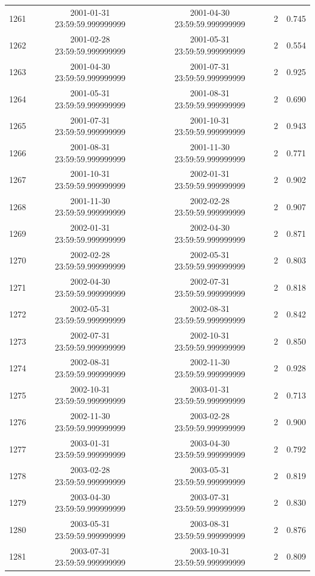 \begin{table}
\begin{tabular}{lcccc}
1261 & 2001-01-31 23:59:59.999999999 & 2001-04-30 23:59:59.999999999 & 2 & 0.745 \\
1262 & 2001-02-28 23:59:59.999999999 & 2001-05-31 23:59:59.999999999 & 2 & 0.554 \\
1263 & 2001-04-30 23:59:59.999999999 & 2001-07-31 23:59:59.999999999 & 2 & 0.925 \\
1264 & 2001-05-31 23:59:59.999999999 & 2001-08-31 23:59:59.999999999 & 2 & 0.690 \\
1265 & 2001-07-31 23:59:59.999999999 & 2001-10-31 23:59:59.999999999 & 2 & 0.943 \\
1266 & 2001-08-31 23:59:59.999999999 & 2001-11-30 23:59:59.999999999 & 2 & 0.771 \\
1267 & 2001-10-31 23:59:59.999999999 & 2002-01-31 23:59:59.999999999 & 2 & 0.902 \\
1268 & 2001-11-30 23:59:59.999999999 & 2002-02-28 23:59:59.999999999 & 2 & 0.907 \\
1269 & 2002-01-31 23:59:59.999999999 & 2002-04-30 23:59:59.999999999 & 2 & 0.871 \\
1270 & 2002-02-28 23:59:59.999999999 & 2002-05-31 23:59:59.999999999 & 2 & 0.803 \\
1271 & 2002-04-30 23:59:59.999999999 & 2002-07-31 23:59:59.999999999 & 2 & 0.818 \\
1272 & 2002-05-31 23:59:59.999999999 & 2002-08-31 23:59:59.999999999 & 2 & 0.842 \\
1273 & 2002-07-31 23:59:59.999999999 & 2002-10-31 23:59:59.999999999 & 2 & 0.850 \\
1274 & 2002-08-31 23:59:59.999999999 & 2002-11-30 23:59:59.999999999 & 2 & 0.928 \\
1275 & 2002-10-31 23:59:59.999999999 & 2003-01-31 23:59:59.999999999 & 2 & 0.713 \\
1276 & 2002-11-30 23:59:59.999999999 & 2003-02-28 23:59:59.999999999 & 2 & 0.900 \\
1277 & 2003-01-31 23:59:59.999999999 & 2003-04-30 23:59:59.999999999 & 2 & 0.792 \\
1278 & 2003-02-28 23:59:59.999999999 & 2003-05-31 23:59:59.999999999 & 2 & 0.819 \\
1279 & 2003-04-30 23:59:59.999999999 & 2003-07-31 23:59:59.999999999 & 2 & 0.830 \\
1280 & 2003-05-31 23:59:59.999999999 & 2003-08-31 23:59:59.999999999 & 2 & 0.876 \\
1281 & 2003-07-31 23:59:59.999999999 & 2003-10-31 23:59:59.999999999 & 2 & 0.809 \\

\end{tabular}
\end{table}
